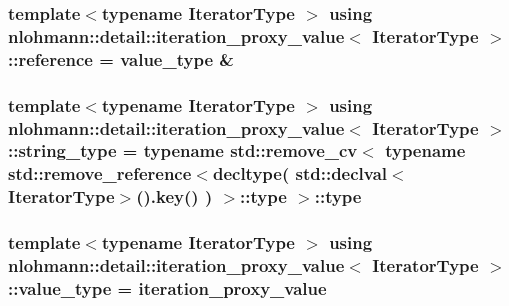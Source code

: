 \subsubsection[{\texorpdfstring{reference}{reference}}]{\setlength{\rightskip}{0pt plus 5cm}template$<$typename Iterator\+Type $>$ using {\bf nlohmann\+::detail\+::iteration\+\_\+proxy\+\_\+value}$<$ Iterator\+Type $>$\+::{\bf reference} =  {\bf value\+\_\+type} \&}\hypertarget{classnlohmann_1_1detail_1_1iteration__proxy__value_a5bc7d3133daab5ec4797f3132e093af8}{}\label{classnlohmann_1_1detail_1_1iteration__proxy__value_a5bc7d3133daab5ec4797f3132e093af8}
\subsubsection[{\texorpdfstring{string\+\_\+type}{string_type}}]{\setlength{\rightskip}{0pt plus 5cm}template$<$typename Iterator\+Type $>$ using {\bf nlohmann\+::detail\+::iteration\+\_\+proxy\+\_\+value}$<$ Iterator\+Type $>$\+::{\bf string\+\_\+type} =  typename std\+::remove\+\_\+cv$<$ typename std\+::remove\+\_\+reference$<$decltype( std\+::declval$<$Iterator\+Type$>$().{\bf key}() ) $>$\+::type $>$\+::type}\hypertarget{classnlohmann_1_1detail_1_1iteration__proxy__value_a1fc63b88a585fa39942007aab69a74e6}{}\label{classnlohmann_1_1detail_1_1iteration__proxy__value_a1fc63b88a585fa39942007aab69a74e6}
\subsubsection[{\texorpdfstring{value\+\_\+type}{value_type}}]{\setlength{\rightskip}{0pt plus 5cm}template$<$typename Iterator\+Type $>$ using {\bf nlohmann\+::detail\+::iteration\+\_\+proxy\+\_\+value}$<$ Iterator\+Type $>$\+::{\bf value\+\_\+type} =  {\bf iteration\+\_\+proxy\+\_\+value}}\hypertarget{classnlohmann_1_1detail_1_1iteration__proxy__value_a5e90a5810cc1bb6c1000eabbfdfe7b9e}{}\label{classnlohmann_1_1detail_1_1iteration__proxy__value_a5e90a5810cc1bb6c1000eabbfdfe7b9e}


